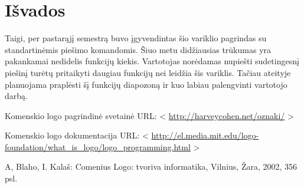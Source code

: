 \documentclass[a4paper,12pt]{article}
\begin{document}
\newpage

\section*{Išvados}


Taigi, per pastarąjį semestrą buvo įgyvendintas šio variklio pagrindas su standartinėmis piešimo komandomis. Šiuo metu didžiausias trūkumas yra pakankamai nedidelis funkcijų kiekis. Vartotojas norėdamas nupiešti sudetingesnį piešinį turėtų pritaikyti daugiau funkcijų nei leidžia šis variklis. Tačiau ateityje planuojama praplėsti šį funkcijų diapozoną ir kuo labiau palengvinti vartotojo darbą. \\

\renewcommand {\refname}{Literatūra}

\begin{thebibliography}{9}





Komenskio logo pagrindinė svetainė URL: <
\url {http://harveycohen.net/oznaki/} >

Komenskio logo dokumentacija URL: <
\url {http://el.media.mit.edu/logo-foundation/what_is_logo/logo_programming.html} >

A, Blaho, I. Kalaš: Comenius Logo: tvoriva informatika, Vilnius, Žara, 2002, 356 psl.
\end{thebibliography}
\end{document}
